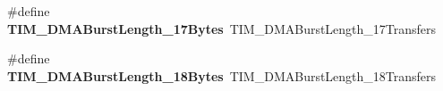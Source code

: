 \begin{DoxyCompactItemize}
\item 
\hypertarget{group__TIM__Legacy_gacffd0dc1f04aa06624a4980dcae6eede}{
\#define {\bfseries TIM\_\-DMABurstLength\_\-17Bytes}~TIM\_\-DMABurstLength\_\-17Transfers}
\label{group__TIM__Legacy_gacffd0dc1f04aa06624a4980dcae6eede}

\item 
\hypertarget{group__TIM__Legacy_ga9c4d457417b1ba72ed0ae9886a75547a}{
\#define {\bfseries TIM\_\-DMABurstLength\_\-18Bytes}~TIM\_\-DMABurstLength\_\-18Transfers}
\label{group__TIM__Legacy_ga9c4d457417b1ba72ed0ae9886a75547a}

\end{DoxyCompactItemize}
